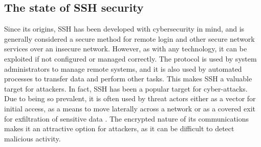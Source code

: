     \subsection{The state of SSH security}
    Since its origins, SSH has been developed with cybersecurity in mind, and is generally considered a secure method for remote login and other secure network services over an insecure network. However, as with any technology, it can be exploited if not configured or managed correctly. The protocol is used by system administrators to manage remote systems, and it is also used by automated processes to transfer data and perform other tasks. This makes SSH a valuable target for attackers. In fact, SSH has been a popular target for cyber-attacks. Due to being so prevalent, it is often used by threat actors either as a vector for initial access, as a means to move laterally across a network or as a covered exit for exfiltration of sensitive data \cite{APTTactics19}. The encrypted nature of its communications makes it an attractive option for attackers, as it can be difficult to detect malicious activity.
    
